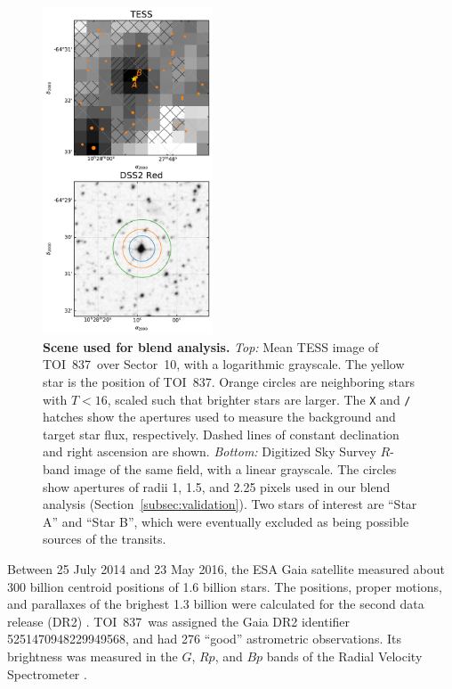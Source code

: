 \documentclass[12pt,twocolumn,tighten]{aastex63}
\newcommand{\tn}{TOI~837} %
\begin{document}
\begin{figure}[!t]
	\begin{center}
		\leavevmode
		\includegraphics[width=0.45\textwidth]{f5.pdf}
	\end{center}
	\vspace{-0.7cm}
	\caption{ {\bf Scene used for blend analysis.}
    {\it Top:} Mean TESS image of \tn\ over Sector~10, with a
    logarithmic grayscale. The yellow star is the position of \tn.
    Orange circles are neighboring stars with $T<16$, scaled such that
    brighter stars are larger. The \texttt{X} and \texttt{/} hatches
    show the apertures used to measure the background and target star
    flux, respectively. Dashed lines of constant declination and right
    ascension are shown.  {\it Bottom:} Digitized Sky Survey $R$-band
    image of the same field, with a linear grayscale. The circles show
    apertures of radii 1, 1.5, and 2.25 pixels used in our blend
    analysis (Section~\ref{subsec:validation}).  Two stars of interest
    are ``Star A'' and ``Star B'', which were eventually excluded as
    being possible sources of the transits.
		\label{fig:scene}
	}
\end{figure}

Between 25 July 2014 and 23 May 2016, the ESA Gaia satellite measured
about 300 billion centroid positions of 1{.}6 billion stars.  The
positions, proper motions, and parallaxes of the brighest 1{.}3
billion were calculated for the second data release (DR2)
\citep{gaia_collaboration_gaia_2016,lindegren_gaiasoln_2018,gaia_collaboration_gaia_2018}.
\tn\ was assigned the Gaia DR2 identifier 5251470948229949568, and had
276 ``good'' astrometric observations. Its brightness was measured in
the $G$, $Rp$, and $Bp$ bands of the Radial Velocity Spectrometer
\citep{cropper_gaia_2018,evans_gaia_2018}.  
\end{document}
